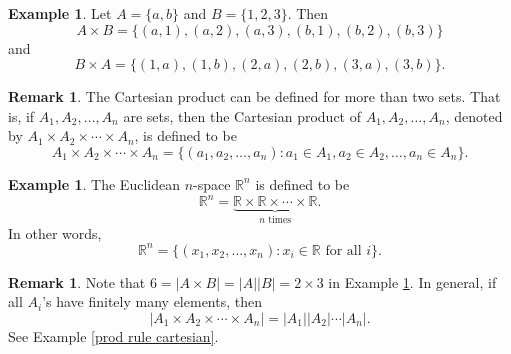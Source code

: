 \documentclass[12pt,letterpaper]{book}
\numberwithin{equation}{section}
\theoremstyle{definition}
\newtheorem{example}[thm]{\textbf{Example}}
\newtheorem{remark}[thm]{\textbf{Remark}}
\begin{document}
\begin{example}\label{finite cartesian} Let $A=\{a,b\}$ and $B=\{1,2,3\}$. Then \\
$$A\times B=\{(a,1), (a,2), (a,3), (b,1), (b,2), (b,3)\}$$ and
$$B\times A=\{(1,a), (1,b), (2,a), (2,b), (3,a), (3,b)\}.$$
\end{example}

\begin{remark} The Cartesian product can be defined for more than two sets. That is, if $A_1,A_2,\ldots,A_n$ are sets, then the Cartesian product of $A_1,A_2,\ldots,A_n$, denoted by $A_1\times A_2\times \cdots \times A_n$, is defined to be
$$A_1\times A_2\times \cdots \times A_n=\{(a_1,a_2,\ldots,a_n): a_1\in A_1,a_2\in A_2,\ldots,a_n\in A_n\}.$$
\end{remark}

\begin{example}
The Euclidean $n$-space $\mathbb{R}^n$ is defined to be
$$\mathbb{R}^n=\underbrace{\mathbb{R}\times \mathbb{R}\times \cdots \times \mathbb{R}}_{n \text{ times}}.$$ In other words,
$$\mathbb{R}^n=\{(x_1,x_2,\ldots,x_n): x_i \in \mathbb{R} \text{ for all }i\}.$$
\end{example}

\begin{remark}
Note that $6=|A\times B|=|A||B|=2\times 3$ in Example \ref{finite cartesian}. In general, if all $A_i$'s have finitely many elements, then
$$|A_1\times A_2 \times \cdots \times A_n|=|A_1||A_2|\cdots|A_n|.$$ See Example \ref{prod rule cartesian}.
\end{remark}
\end{document}
